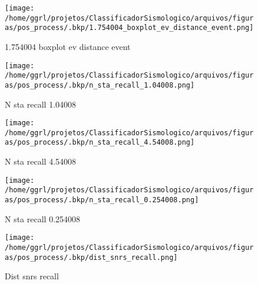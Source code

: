                     \begin{figure}[H]
                        \centering
                        \texttt{[image: /home/ggrl/projetos/ClassificadorSismologico/arquivos/figuras/pos\_process/.bkp/1.754004\_boxplot\_ev\_distance\_event.png]}
                        \caption{1.754004 boxplot ev distance event}
                        \label{fig:1.754004_boxplot_ev_distance_event}
                    \end{figure}
                

                    \begin{figure}[H]
                        \centering
                        \texttt{[image: /home/ggrl/projetos/ClassificadorSismologico/arquivos/figuras/pos\_process/.bkp/n\_sta\_recall\_1.04008.png]}
                        \caption{N sta recall 1.04008}
                        \label{fig:n_sta_recall_1.04008}
                    \end{figure}
                

                    \begin{figure}[H]
                        \centering
                        \texttt{[image: /home/ggrl/projetos/ClassificadorSismologico/arquivos/figuras/pos\_process/.bkp/n\_sta\_recall\_4.54008.png]}
                        \caption{N sta recall 4.54008}
                        \label{fig:n_sta_recall_4.54008}
                    \end{figure}
                

                    \begin{figure}[H]
                        \centering
                        \texttt{[image: /home/ggrl/projetos/ClassificadorSismologico/arquivos/figuras/pos\_process/.bkp/n\_sta\_recall\_0.254008.png]}
                        \caption{N sta recall 0.254008}
                        \label{fig:n_sta_recall_0.254008}
                    \end{figure}
                

                    \begin{figure}[H]
                        \centering
                        \texttt{[image: /home/ggrl/projetos/ClassificadorSismologico/arquivos/figuras/pos\_process/.bkp/dist\_snrs\_recall.png]}
                        \caption{Dist snrs recall}
                        \label{fig:dist_snrs_recall}
                    \end{figure}
                

